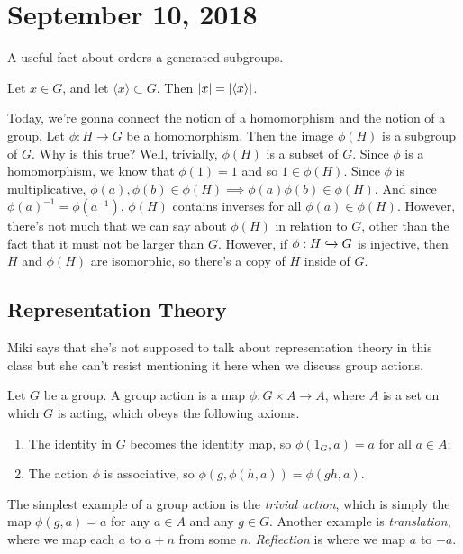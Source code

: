 \section{September 10, 2018}

A useful fact about orders a generated subgroups.

\begin{lemma}
Let $x \in G$, and let $\langle x \rangle \subset G$. Then $\abs{x} = \abs{\langle x \rangle}$.
\end{lemma}

Today, we're gonna connect the notion of a homomorphism and the notion of a group. Let $\phi : H \to G$ be a homomorphism. Then the image $\phi(H)$ is a subgroup of $G$. Why is this true? Well, trivially, $\phi(H)$ is a subset of $G$. Since $\phi$ is a homomorphism, we know that $\phi(1) = 1$ and so $1 \in \phi(H)$. Since $\phi$ is multiplicative, $\phi(a),\phi(b) \in \phi(H) \implies \phi(a)\phi(b) \in \phi(H)$. And since $\phi(a)^{-1} = \phi(a^{-1})$, $\phi(H)$ contains inverses for all $\phi(a) \in \phi(H)$. However, there's not much that we can say about $\phi(H)$ in relation to $G$, other than the fact that it must not be larger than $G$. However, if $\phi : H \xhookrightarrow{} G$ is injective, then $H$ and $\phi(H)$ are isomorphic, so there's a copy of $H$ inside of $G$.

\subsection{Representation Theory}

Miki says that she's not supposed to talk about representation theory in this class but she can't resist mentioning it here when we discuss group actions.

\begin{definition}
Let $G$ be a group. A group action is a map $\phi : G \times A \to A$, where $A$ is a set on which $G$ is acting, which obeys the following axioms.
\begin{enumerate}
\item The identity in $G$ becomes the identity map, so $\phi(1_G, a) = a$ for all $a \in A$;
\item The action $\phi$ is associative, so $\phi(g, \phi(h,a)) = \phi(gh, a)$.
\end{enumerate} 
\end{definition}

The simplest example of a group action is the \emph{trivial action}, which is simply the map $\phi(g,a) = a$ for any $a \in A$ and any $g \in G$. Another example is \emph{translation}, where we map each $a$ to $a + n$ from some $n$. \emph{Reflection} is where we map $a$ to $-a$.


